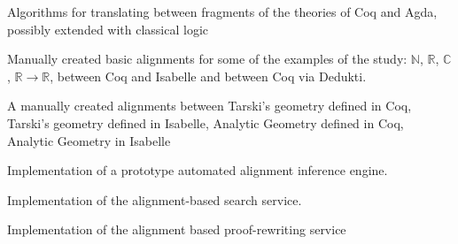 \begin{workpackage}
\begin{wpdelivs}
  \begin{wpdeliv}[due=24,miles=???,id=prooftheoretical,dissem=PU,nature=DEM,lead=Lee]
    {Algorithms for translating between fragments of the theories of
      Coq and Agda, possibly extended with classical logic}
  \end{wpdeliv}
  \begin{wpdeliv}[due=24,miles=???,id=aligningnumbers,dissem=PU,nature=DEM,lead=Str]
    {Manually created basic alignments for some of the examples of the
      study: $\mathbb{N}$, $\mathbb{R}$, $\mathbb{C}$, $\mathbb{R}
      \rightarrow \mathbb{R}$, between Coq and Isabelle and between
      Coq via Dedukti.}
  \end{wpdeliv}
  \begin{wpdeliv}[due=36,miles=startup,id=aligninggeometries,dissem=PU,nature=DEM,lead=Bel]
    {A manually created alignments between Tarski's geometry defined
      in Coq, Tarski's geometry defined in Isabelle, Analytic Geometry
      defined in Coq, Analytic Geometry in Isabelle}
  \end{wpdeliv}
  \begin{wpdeliv}[due=48,miles=startup,id=automatedalignment,dissem=PU,nature=DEM,lead=Imt]
    {Implementation of a prototype automated alignment inference engine.}
  \end{wpdeliv}
  \begin{wpdeliv}[due=48,miles=???,id=alignsearch,dissem=PU,nature=DEM,lead=Fau]
    {Implementation of the alignment-based search service.}
  \end{wpdeliv}
  \begin{wpdeliv}[due=48,miles=???,id=alignproofrewr,dissem=PU,nature=DEM,lead=Bol]
    {Implementation of the alignment based proof-rewriting service}
  \end{wpdeliv}

\end{wpdelivs}
\end{workpackage}


